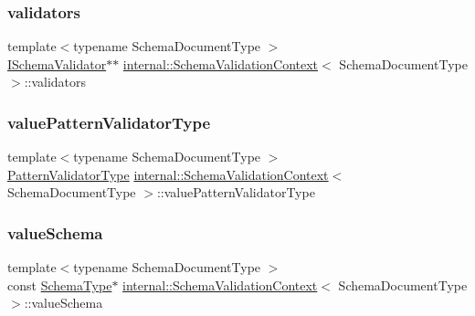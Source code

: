 \subsubsection{\texorpdfstring{validators}{validators}}
{\footnotesize\ttfamily template$<$typename Schema\+Document\+Type $>$ \\
\hyperlink{classinternal_1_1ISchemaValidator}{I\+Schema\+Validator}$\ast$$\ast$ \hyperlink{structinternal_1_1SchemaValidationContext}{internal\+::\+Schema\+Validation\+Context}$<$ Schema\+Document\+Type $>$\+::validators}

\mbox{\label{structinternal_1_1SchemaValidationContext_acc1ba6a63e678d0efff8a63d617c4d0d}} 
\subsubsection{\texorpdfstring{value\+Pattern\+Validator\+Type}{valuePatternValidatorType}}
{\footnotesize\ttfamily template$<$typename Schema\+Document\+Type $>$ \\
\hyperlink{structinternal_1_1SchemaValidationContext_a4fb1b8fe7ecb9d4608e6b0ac0716826c}{Pattern\+Validator\+Type} \hyperlink{structinternal_1_1SchemaValidationContext}{internal\+::\+Schema\+Validation\+Context}$<$ Schema\+Document\+Type $>$\+::value\+Pattern\+Validator\+Type}

\mbox{\label{structinternal_1_1SchemaValidationContext_a34865d65fb3cbb01bc497d0efade0458}} 
\subsubsection{\texorpdfstring{value\+Schema}{valueSchema}}
{\footnotesize\ttfamily template$<$typename Schema\+Document\+Type $>$ \\
const \hyperlink{structinternal_1_1SchemaValidationContext_a79b155ab3711b97b6e33ced450614397}{Schema\+Type}$\ast$ \hyperlink{structinternal_1_1SchemaValidationContext}{internal\+::\+Schema\+Validation\+Context}$<$ Schema\+Document\+Type $>$\+::value\+Schema}

